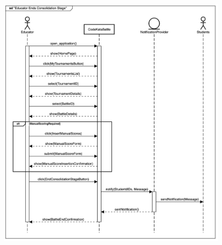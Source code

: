 \documentclass{Configuration_Files/Template}
\begin{document}
\begin{figure}[H]
\includegraphics[scale = 0.45]{Images/SequenceDiagrams/EducatorEndsBattle.png}\\
\centering
\end{figure}
\end{document}
